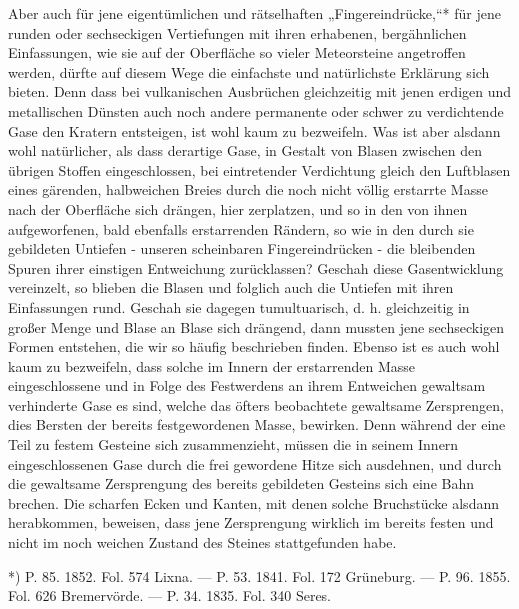 \documentclass[a4paper, 11pt, oneside, polutonikogreek, german]{article}
\begin{document}
Aber auch für jene eigentümlichen und rätselhaften „Fingereindrücke,“* für jene runden oder sechseckigen Vertiefungen mit ihren erhabenen, bergähnlichen Einfassungen, wie sie auf der Oberfläche so vieler Meteorsteine angetroffen werden, dürfte auf diesem Wege die einfachste und natürlichste Erklärung sich bieten. Denn dass bei vulkanischen Ausbrüchen gleichzeitig mit jenen erdigen und metallischen Dünsten auch noch andere permanente oder schwer zu verdichtende Gase den Kratern entsteigen, ist wohl kaum zu bezweifeln. Was ist aber alsdann wohl natürlicher, als dass derartige Gase, in Gestalt von Blasen zwischen den übrigen Stoffen eingeschlossen, bei eintretender Verdichtung gleich den Luftblasen eines gärenden, halbweichen Breies durch die noch nicht völlig erstarrte Masse nach der Oberfläche sich drängen, hier zerplatzen, und so in den von ihnen aufgeworfenen, bald ebenfalls erstarrenden Rändern, so wie in den durch sie gebildeten Untiefen - unseren scheinbaren Fingereindrücken - die bleibenden Spuren ihrer einstigen Entweichung zurücklassen? Geschah diese Gasentwicklung vereinzelt, so blieben die Blasen und folglich auch die Untiefen mit ihren Einfassungen rund. Geschah sie dagegen tumultuarisch, d. h. gleichzeitig in großer Menge und Blase an Blase sich drängend, dann mussten jene sechseckigen Formen entstehen, die wir so häufig beschrieben finden. Ebenso ist es auch wohl kaum zu bezweifeln, dass solche im Innern der erstarrenden Masse eingeschlossene und in Folge des Festwerdens an ihrem Entweichen gewaltsam verhinderte Gase es sind, welche das öfters beobachtete gewaltsame Zersprengen, dies Bersten der bereits festgewordenen Masse, bewirken. Denn während der eine Teil zu festem Gesteine sich zusammenzieht, müssen die in seinem Innern eingeschlossenen Gase durch die frei gewordene Hitze sich ausdehnen, und durch die gewaltsame Zersprengung des bereits gebildeten Gesteins sich eine Bahn brechen. Die scharfen Ecken und Kanten, mit denen solche Bruchstücke alsdann herabkommen, beweisen, dass jene Zersprengung wirklich im bereits festen und nicht im noch weichen Zustand des Steines stattgefunden habe.

*) P. 85. 1852. Fol. 574 Lixna. — P. 53. 1841. Fol. 172 Grüneburg. — P. 96. 1855. Fol. 626 Bremervörde. — P. 34. 1835. Fol. 340 Seres.
\end{document}
